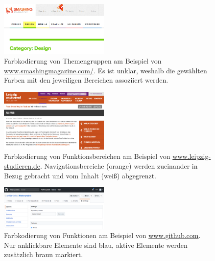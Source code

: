\begin{figure}[]
	\centering
	\includegraphics[width=0.48\textwidth]{img/theme_coding.png}
	\caption{Farbkodierung von Themengruppen am Beispiel von \url{www.smashingmagazine.com/}. Es ist unklar, weshalb die gewählten Farben mit den jeweiligen Bereichen assoziiert werden.}
	\label{fig:theme_coding}
\end{figure}

\begin{figure}[]
	\centering
	\includegraphics[width=0.48\textwidth]{img/functional_areas.png}
	\caption{Farbkodierung von Funktionsbereichen am Beispiel von \url{www.leipzig-studieren.de}. Navigationsbereiche (orange) werden zueinander in Bezug gebracht und vom Inhalt (weiß) abgegrenzt.}
	\label{fig:functional_areas}
\end{figure}

\begin{figure}[]
	\centering
	\includegraphics[width=0.48\textwidth]{img/functions.png}
	\caption{Farbkodierung von Funktionen am Beispiel von \url{www.github.com}. Nur anklickbare Elemente sind blau, aktive Elemente werden zusätzlich braun markiert.}
	\label{fig:functions}
\end{figure}

